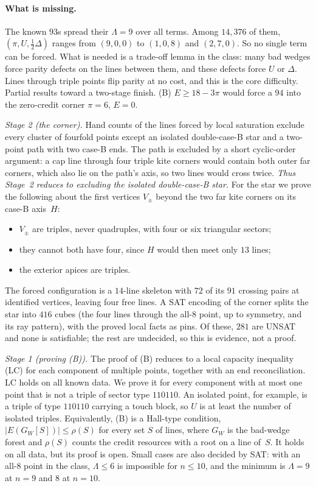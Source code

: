 \documentclass[11pt]{article}
\theoremstyle{definition}
\theoremstyle{remark}
\newcommand{\Lam}{\Lambda}
\begin{document}
\paragraph{What is missing.} The known $93$s spread their $\Lam=9$ over all terms. Among $14{,}376$ of them,
$(\pi,U,\tfrac12\Delta)$ ranges from $(9,0,0)$ to $(1,0,8)$ and $(2,7,0)$. So no single term can be forced. What is
needed is a trade-off lemma in the class: many bad wedges force parity defects on the lines between them, and these
defects force $U$ or $\Delta$. Lines through triple points flip parity at no cost, and this is the core difficulty.
Partial results toward a two-stage finish. (B) $E\ge 18-3\pi$ would force a $94$ into the zero-credit corner
$\pi=6$, $E=0$.

\emph{Stage 2 (the corner).} Hand counts of the lines forced by local saturation exclude every cluster of fourfold
points except an isolated double-case-B star and a two-point path with two case-B ends. The path is excluded by a
short cyclic-order argument: a cap line through four triple kite corners would contain both outer far corners, which
also lie on the path's axis, so two lines would cross twice. \emph{Thus Stage~2 reduces to excluding the isolated
double-case-B star.} For the star we prove the following about the first vertices $V_\pm$ beyond the two far kite
corners on its case-B axis~$H$:
\begin{itemize}[nosep]
\item $V_\pm$ are triples, never quadruples, with four or six triangular sectors;
\item they cannot both have four, since $H$ would then meet only $13$ lines;
\item the exterior apices are triples.
\end{itemize}
The forced configuration is a $14$-line skeleton with $72$ of its $91$ crossing pairs at identified vertices, leaving
four free lines. A SAT encoding of the corner splits the star into $416$ cubes (the four lines through the all-8
point, up to symmetry, and its ray pattern), with the proved local facts as pins. Of these, $281$ are UNSAT and none
is satisfiable; the rest are undecided, so this is evidence, not a proof.

\emph{Stage 1 (proving (B)).} The proof of (B) reduces to a local capacity inequality (LC) for each component of
multiple points, together with an end reconciliation. LC holds on all known data. We prove it for every component
with at most one point that is not a triple of sector type $110110$. An isolated point, for example, is a triple of
type $110110$ carrying a touch block, so $U$ is at least the number of isolated triples. Equivalently, (B) is a
Hall-type condition, $|E(G_W[S])|\le\rho(S)$ for every set $S$ of lines, where $G_W$ is the bad-wedge forest and
$\rho(S)$ counts the credit resources with a root on a line of~$S$. It holds on all data, but its proof is open.
Small cases are also decided by SAT: with an all-8 point in
the class, $\Lam\le 6$ is impossible for $n\le 10$, and the minimum is $\Lam=9$ at $n=9$ and $8$ at $n=10$.
\end{document}
